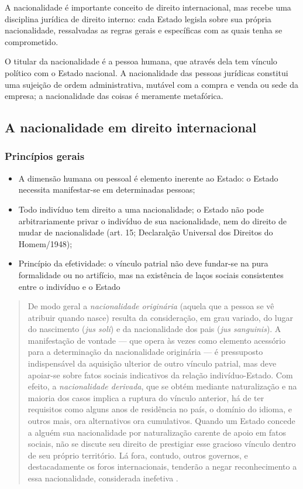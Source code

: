 \documentclass{article}
\begin{document}
A nacionalidade é importante conceito de direito internacional, mas recebe uma disciplina jurídica de direito interno: cada Estado legisla sobre sua própria nacionalidade, ressalvadas as regras gerais e específicas com as quais tenha se comprometido.

O titular da nacionalidade é a pessoa humana, que através dela tem vínculo político com o Estado nacional. A nacionalidade das pessoas jurídicas constitui uma sujeição de ordem administrativa, mutável com a compra e venda ou sede da empresa; a nacionalidade das coisas é meramente metafórica.

\subsection{A nacionalidade em direito internacional}

\subsubsection{Princípios gerais}

\begin{itemize}
    \item A dimensão humana ou pessoal é elemento inerente ao Estado: o Estado necessita manifestar-se em determinadas pessoas;
    \item Todo indivíduo tem direito a uma nacionalidade; o Estado não pode arbitrariamente privar o indivíduo de sua nacionalidade, nem do direito de mudar de nacionalidade (art. 15; Declaralção Universal dos Direitos do Homem/1948);
    \item Princípio da efetividade: o vínculo patrial não deve fundar-se na pura formalidade ou no artifício, mas na existência de laços sociais consistentes entre o indivíduo e o Estado
\end{itemize}

\begin{quote}
    De modo geral a \textit{nacionalidade originária} (aquela que a pessoa se vê atribuir quando nasce) resulta da consideração, em grau variado, do lugar do nascimento (\textit{jus soli}) e da nacionalidade dos pais (\textit{jus sanguinis}). A manifestação de vontade — que opera às vezes como elemento acessório para a determinação da nacionalidade originária — é pressuposto indispensável da aquisição ulterior de outro vínculo patrial, mas deve apoiar-se sobre fatos sociais indicativos da relação indivíduo-Estado. Com efeito, a \textit{nacionalidade derivada}, que se obtém mediante naturalização e na maioria dos casos implica a ruptura do vínculo anterior, há de ter requisitos como alguns anos de residência no país, o domínio do idioma, e outros mais, ora alternativos ora cumulativos. Quando um Estado concede a alguém sua nacionalidade por naturalização carente de apoio em fatos sociais, não se discute seu direito de prestigiar esse gracioso vínculo dentro de seu próprio território. Lá fora, contudo, outros governos, e destacadamente os foros internacionais, tenderão a negar reconhecimento a essa nacionalidade, considerada inefetiva \cite[p.~80]{rezek_direito_2024}.
\end{quote}
\end{document}
